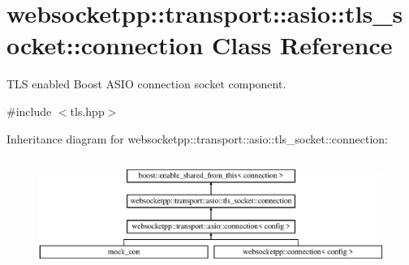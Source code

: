 \hypertarget{classwebsocketpp_1_1transport_1_1asio_1_1tls__socket_1_1connection}{}\section{websocketpp\+:\+:transport\+:\+:asio\+:\+:tls\+\_\+socket\+:\+:connection Class Reference}
\label{classwebsocketpp_1_1transport_1_1asio_1_1tls__socket_1_1connection}


T\+LS enabled Boost A\+S\+IO connection socket component.  




{\ttfamily \#include $<$tls.\+hpp$>$}

Inheritance diagram for websocketpp\+:\+:transport\+:\+:asio\+:\+:tls\+\_\+socket\+:\+:connection\+:\begin{figure}[H]
\begin{center}
\leavevmode
\includegraphics[height=3.648208cm]{classwebsocketpp_1_1transport_1_1asio_1_1tls__socket_1_1connection}
\end{center}
\end{figure}
